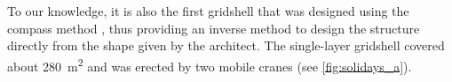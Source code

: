 To our knowledge, it is also the first gridshell that was designed using the compass method \cite{IL10}, thus providing an inverse method to design the structure directly from the shape given by the architect. The single-layer gridshell covered about \SI{280}{m^2} and was erected by two mobile cranes (see \cref{fig:solidays_a}).






